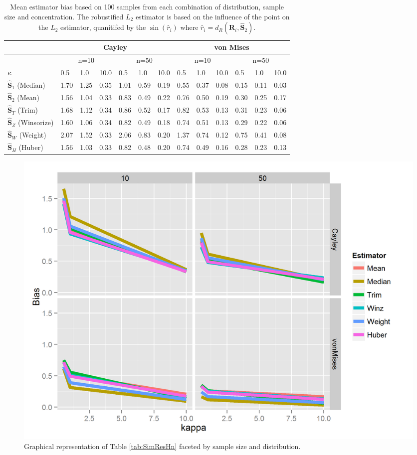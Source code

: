 \documentclass{article}\usepackage[]{graphicx}\usepackage[]{color}
\newcommand{\ProjMean}{{\widehat{\bm S}_{2}}}
\newcommand{\ProjMedian}{{\widehat{\bm S}_{1}}}
\newcommand{\HuberMean}{{\widehat{\bm S}_H}}
\newcommand{\WeightMean}{{\widehat{\bm S}_W}}
\newcommand{\TrimMean}{{\widehat{\bm S}_T}}
\newcommand{\WinzMean}{{\widehat{\bm S}_Z}}
\begin{document}
\begin{table}[ht]
\centering
\begin{tabular}{l|lll|lll|lll|lll}
  \hline
 & \multicolumn{6}{|c|}{Cayley} & \multicolumn{6}{|c}{von Mises}   \\ 
\hline
   &  \multicolumn{3}{|c|}{n=10} & \multicolumn{3}{|c|}{n=50} & \multicolumn{3}{|c|}{n=10} & \multicolumn{3}{|c}{n=50} \\
  $\kappa$ &  0.5 &  1.0 & 10.0 &  0.5 &  1.0 & 10.0 &  0.5 &  1.0 & 10.0 &  0.5 &  1.0 & 10.0 \\ \hline
  $\ProjMedian$ (Median) & 1.70 & 1.25 & 0.35 & 1.01 & 0.59 & 0.19 & 0.55 & 0.37 & 0.08 & 0.15 & 0.11 & 0.03 \\ 
  $\ProjMean$ (Mean) & 1.56 & 1.04 & 0.33 & 0.83 & 0.49 & 0.22 & 0.76 & 0.50 & 0.19 & 0.30 & 0.25 & 0.17 \\ 
   $\TrimMean$ (Trim) & 1.68 & 1.12 & 0.34 & 0.86 & 0.52 & 0.17 & 0.82 & 0.53 & 0.13 & 0.31 & 0.23 & 0.06 \\ 
  $\WinzMean$ (Winsorize) & 1.60 & 1.06 & 0.34 & 0.82 & 0.49 & 0.18 & 0.74 & 0.51 & 0.13 & 0.29 & 0.22 & 0.06 \\ 
  $\WeightMean$ (Weight) & 2.07 & 1.52 & 0.33 & 2.06 & 0.83 & 0.20 & 1.37 & 0.74 & 0.12 & 0.75 & 0.41 & 0.08 \\ 
  $\HuberMean$ (Huber) & 1.56 & 1.03 & 0.33 & 0.82 & 0.48 & 0.20 & 0.74 & 0.49 & 0.16 & 0.28 & 0.23 & 0.13 \\ 
   \hline
\end{tabular}
\caption{Mean estimator bias based on 100 samples from each combination of distribution, sample size and concentration.  The robustified $L_2$ estimator is based on the influence of the point on the $L_2$ estimator, quanitifed by the $\sin(\hat r_i)$ where $\hat r_i=d_R(\bm R_i,\ProjMean)$.}
\label{tab:SimResC}
\end{table}




\begin{figure}
\centering
\includegraphics[width=.7\textwidth]{Estimator.png}
\caption{Graphical representation of Table \ref{tab:SimResHn} faceted by sample size and distribution.}
\end{figure}
\end{document}
